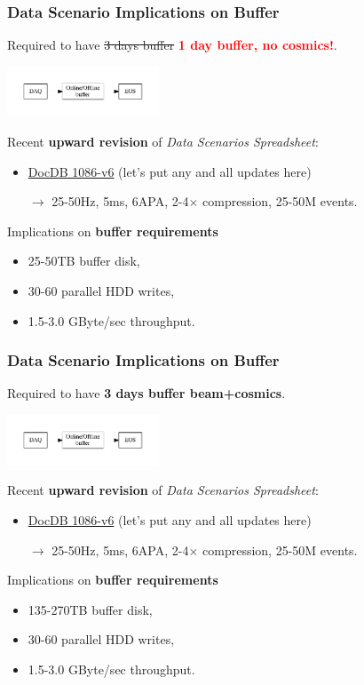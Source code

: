\documentclass[xcolor=dvipsnames]{beamer}
\begin{document}
\begin{frame}
  \frametitle{Data Scenario Implications on Buffer}

  Required to have \sout{3 days buffer} \textbf{\textcolor{red}{1 day buffer, no cosmics!}}.

  \begin{center}
    \includegraphics[height=1.5cm,clip,trim=0 10mm 0 10mm]{big-picture.pdf}
  \end{center}

  Recent \textbf{upward revision} of \textit{Data Scenarios Spreadsheet}:
  \begin{itemize}
  \item \href{http://docs.dunescience.org:8080/cgi-bin/ShowDocument?docid=1086}{DocDB 1086-v6} (let's put any and all updates here)
  \item[$\rightarrow$] 25-50Hz, 5ms, 6APA, 2-4$\times$ compression, 25-50M events.
  \end{itemize}
  Implications on \textbf{buffer requirements}
  \begin{itemize}
  \item 25-50TB buffer disk, 
  \item 30-60 parallel HDD writes, 
  \item 1.5-3.0 GByte/sec throughput.
  \end{itemize}
\end{frame}

\begin{frame}
  \frametitle{Data Scenario Implications on Buffer}

  Required to have \textbf{3 days buffer beam+cosmics}.

  \begin{center}
    \includegraphics[height=1.5cm,clip,trim=0 10mm 0 10mm]{big-picture.pdf}
  \end{center}

  Recent \textbf{upward revision} of \textit{Data Scenarios Spreadsheet}:
  \begin{itemize}
  \item \href{http://docs.dunescience.org:8080/cgi-bin/ShowDocument?docid=1086}{DocDB 1086-v6} (let's put any and all updates here)
  \item[$\rightarrow$] 25-50Hz, 5ms, 6APA, 2-4$\times$ compression, 25-50M events.
  \end{itemize}
  Implications on \textbf{buffer requirements}
  \begin{itemize}
  \item 135-270TB buffer disk, 
  \item 30-60 parallel HDD writes, 
  \item 1.5-3.0 GByte/sec throughput.
  \end{itemize}
\end{frame}
\end{document}
